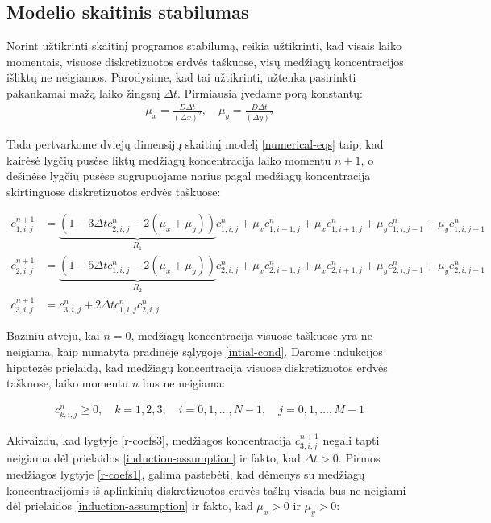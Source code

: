 \subsection{Modelio skaitinis stabilumas}

Norint užtikrinti skaitinį programos stabilumą, reikia užtikrinti, kad visais laiko momentais, visuose diskretizuotos erdvės taškuose, visų medžiagų koncentracijos išliktų ne neigiamos. Parodysime, kad tai užtikrinti, užtenka pasirinkti pakankamai mažą laiko žingsnį $\Delta t$. Pirmiausia įvedame porą konstantų:
\begin{align*}
\mu_x = \frac{D\Delta t}{(\Delta x)^2}, \quad
\mu_y = \frac{D\Delta t}{(\Delta y)^2}
\end{align*}

Tada pertvarkome dviejų dimensijų skaitinį modelį \eqref{numerical-eqs} taip, kad kairėsė lygčių pusėse liktų medžiagų koncentracija laiko momentu $n+1$, o dešinėse lygčių pusėse sugrupuojame narius pagal medžiagų koncentracija skirtinguose diskretizuotos erdvės taškuose:

\begin{subequations} \label{eqs:r-coefs}
    \begin{align}
    c^{n+1}_{1,i,j}&=\underbrace{(1-3\Delta tc^{n}_{2,i,j}-2(\mu_x+\mu_y))}_{R_1}c^n_{1,i,j}+\mu_xc^n_{1,i-1,j}+\mu_xc^n_{1,i+1,j}+\mu_yc^n_{1,i,j-1}+\mu_yc^n_{1,i,j+1} \label{r-coefs1}\\
    c^{n+1}_{2,i,j}&=\underbrace{(1-5\Delta tc^{n}_{1,i,j}-2(\mu_x+\mu_y))}_{R_2}c^n_{2,i,j}+\mu_xc^n_{2,i-1,j}+\mu_xc^n_{2,i+1,j}+\mu_yc^n_{2,i,j-1}+\mu_yc^n_{2,i,j+1} \label{r-coefs2}\\
    c^{n+1}_{3,i,j}&=c^n_{3,i,j}+2\Delta tc^{n}_{1,i,j}c^{n}_{2,i,j} \label{r-coefs3}
    \end{align}
\end{subequations}

Baziniu atveju, kai $n=0$, medžiagų koncentracija visuose taškuose yra ne neigiama, kaip numatyta pradinėje sąlygoje \eqref{intial-cond}. Darome indukcijos hipotezės prielaidą, kad medžiagų koncentracija visuose diskretizuotos erdvės taškuose, laiko momentu $n$ bus ne neigiama:

\begin{align} \label{induction-assumption}
    c^n_{k,i,j} \geqslant 0, \quad k=1,2,3,\quad i=0,1,\dots,N-1,\quad j=0,1,\dots,M-1
\end{align}

Akivaizdu, kad lygtyje \eqref{r-coefs3}, medžiagos koncentracija $c^{n+1}_{3,i,j}$ negali tapti neigiama dėl prielaidos \eqref{induction-assumption} ir fakto, kad $\Delta t>0$. Pirmos medžiagos lygtyje \eqref{r-coefs1}, galima pastebėti, kad dėmenys su medžiagų koncentracijomis iš aplinkinių diskretizuotos erdvės taškų visada bus ne neigiami dėl prielaidos \eqref{induction-assumption} ir fakto, kad $\mu_x>0$ ir $\mu_y>0$:

